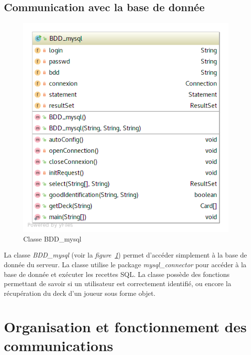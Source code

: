 \documentclass[a4paper,11pt]{report}
\begin{document}
\subsection{Communication avec la base de donnée}

  \begin{figure}[th]
      \begin{center}
        \includegraphics[scale=0.3]{Assets/UML_BDD.png}
        \caption{Classe BDD\_mysql}
        \label{Classe BDD_mysql}
      \end{center}
    \end{figure}
    
    La classe \textit{BDD\_mysql} (voir la \textit{figure~\ref{Classe BDD_mysql}}) permet d’accéder simplement à la base de donnée du serveur. La classe utilise le package \textit{mysql\_connector} pour accéder à la base de donnée et exécuter les recettes SQL. La classe possède des fonctions permettant de savoir si un utilisateur est correctement identifié, ou encore la récupération du deck d’un joueur sous forme objet.




\section{Organisation et fonctionnement des communications}
\end{document}
